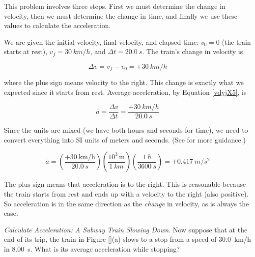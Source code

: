 \documentclass[main-ap-physics.tex]{subfiles}
\begin{document}
This problem involves three steps. First we must determine the change in velocity, then we must determine the change in time, and finally we use these values to calculate the acceleration.

\vspace{1em}

We are given the initial velocity, final velocity, and elapsed time: $v_0 = 0$ (the train starts at rest), $v_f = \SI{30}{km/h}$, and $\Delta t = \SI{20.0}{s}$. The train's change in velocity is

\begin{equation*}
    \Delta v = v_f - v_0 = +\SI{30}{km/h}
\end{equation*}

where the plus sign means velocity to the right. This change is exactly what we expected since it starts from rest. Average acceleration, by Equation \eqref{vdyjX5}, is

\begin{equation*}
    \bar{a} = \frac{\Delta v}{\Delta t} = \frac{+\SI{30}{km/h}}{\SI{20.0}{s}}
\end{equation*}

Since the units are mixed (we have both hours and seconds for time), we need to convert everything into SI units of meters and seconds. (See  for more guidance.) 

\begin{equation*}
    \bar{a} = \left(\frac{+\SI[per-mode=fraction]{30}{\kilo\meter\per\hour}}{\SI{20.0}{s}}\right)
        \left(\frac{10^3\,\text{m}}{\SI{1}{km}}\right)\left(\frac{\SI{1}{h}}{\SI{3600}{s}}\right) = +\SI{0.417}{m/s^2}
\end{equation*}

The plus sign means that acceleration is to the right. This is reasonable because the train starts from rest and ends up with a velocity to the right (also positive). So acceleration is in the same direction as the \textit{change} in velocity, as is always the case.

\endsolution

\begin{example} \label{dHBSwG}
    \textit{Calculate Acceleration: A Subway Train Slowing Down}. Now suppose that at the end of its trip, the train in Figure \ref{}(a) slows to a stop from a speed of \SI{30.0}{km/h} in \SI{8.00}{s}. What is its average acceleration while stopping?
\end{example}
\end{document}
